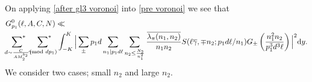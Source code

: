 \documentclass[12pt,a4paper,twoside, reqno]{amsart}
\newcommand{\shortmod}{\ensuremath{\negthickspace \negthickspace \negthickspace \pmod}}
\newcommand{\sumstar}{\sideset{}{^*}\sum}
\begin{document}
On applying \eqref{after gl3 voronoi}  into \eqref{pre voronoi}  we see that 
\begin{align}\label{n_2 dyadic}
&G_{p_1}^0(\ell, A,C,N) \ll  \notag \\
       &\mathop{\sumstar_{ \substack{d \sim \frac{C}{A M_2^{b_2}}
       } } }   \sumstar_{\substack{ \gamma \shortmod{dp_1} }  }   \int_{-K}^K \Big| \sum_{\pm}p_1d \mathop{ \sum_{ \substack{n_1|p_1d\ell  } }}  \sum_{n_2 \leq  \frac{N_2}{n_1^2}  } \frac{\overline{\lambda_\pi(n_1,n_2)}}{ n_1{n_2} }S(\ell \overline{\gamma}, \mp n_2;p_1d\ell /n_1 )G_\pm \left( \frac{n_1^2n_2}{p_1^3d^3 \ell}\right) \Big|^2 \mathrm{d}y.
\end{align}
We consider two cases; small $n_2$ and large $n_2$.   
\end{document}
